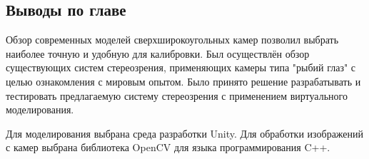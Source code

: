\subsection{Выводы по главе}

Обзор современных моделей сверхширокоугольных камер позволил выбрать 
наиболее точную и удобную для калибровки. Был осуществлён обзор существующих
систем стереозрения, применяющих камеры типа "рыбий глаз" с целью ознакомления 
с мировым опытом. Было принято решение разрабатывать и тестировать предлагаемую 
систему стереозрения с применением виртуального  моделирования. 

Для моделирования выбрана среда разработки Unity. Для обработки изображений
с камер выбрана библиотека OpenCV для языка программирования C++. 